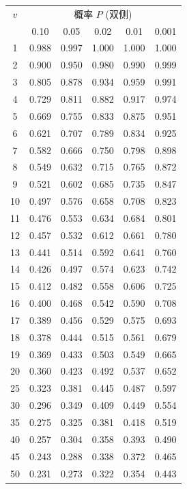 \documentclass[lang=cn,10pt]{elegantbook}
\begin{document}
\begin{longtable}{c|ccccc}
    \hline
    $v$ & \multicolumn{5}{c}{概率 $P$ (双侧)} \\
    & 0.10 & 0.05 & 0.02 & 0.01 & 0.001 \\
    \hline
    \endhead
    1  & 0.988 & 0.997 & 1.000 & 1.000 & 1.000 \\
    2  & 0.900 & 0.950 & 0.980 & 0.990 & 0.999 \\
    3  & 0.805 & 0.878 & 0.934 & 0.959 & 0.991 \\
    4  & 0.729 & 0.811 & 0.882 & 0.917 & 0.974 \\
    5  & 0.669 & 0.755 & 0.833 & 0.875 & 0.951 \\
    6  & 0.621 & 0.707 & 0.789 & 0.834 & 0.925 \\
    7  & 0.582 & 0.666 & 0.750 & 0.798 & 0.898 \\
    8  & 0.549 & 0.632 & 0.715 & 0.765 & 0.872 \\
    9  & 0.521 & 0.602 & 0.685 & 0.735 & 0.847 \\
    10 & 0.497 & 0.576 & 0.658 & 0.708 & 0.823 \\
    11 & 0.476 & 0.553 & 0.634 & 0.684 & 0.801 \\
    12 & 0.457 & 0.532 & 0.612 & 0.661 & 0.780 \\
    13 & 0.441 & 0.514 & 0.592 & 0.641 & 0.760 \\
    14 & 0.426 & 0.497 & 0.574 & 0.623 & 0.742 \\
    15 & 0.412 & 0.482 & 0.558 & 0.606 & 0.725 \\
    16 & 0.400 & 0.468 & 0.542 & 0.590 & 0.708 \\
    17 & 0.389 & 0.456 & 0.529 & 0.575 & 0.693 \\
    18 & 0.378 & 0.444 & 0.515 & 0.561 & 0.679 \\
    19 & 0.369 & 0.433 & 0.503 & 0.549 & 0.665 \\
    20 & 0.360 & 0.423 & 0.492 & 0.537 & 0.652 \\
    25 & 0.323 & 0.381 & 0.445 & 0.487 & 0.597 \\
    30 & 0.296 & 0.349 & 0.409 & 0.449 & 0.554 \\
    35 & 0.275 & 0.325 & 0.381 & 0.418 & 0.519 \\
    40 & 0.257 & 0.304 & 0.358 & 0.393 & 0.490 \\
    45 & 0.243 & 0.288 & 0.338 & 0.372 & 0.465 \\
    50 & 0.231 & 0.273 & 0.322 & 0.354 & 0.443 \\
    \hline
\end{longtable}
\end{document}
